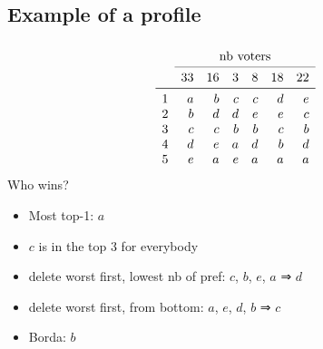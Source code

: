 \documentclass[french,english]{beamer}
\begin{document}
\subsection{Example of a profile}
\begin{frame}[fragile]
	\frametitle{\subsecname}
	\begin{equation}
		\begin{array}{lrrrrrr}
			&\multicolumn{6}{c}{\text{nb voters}}\\
		\cmidrule{2-7}
				&33	&16	&3	&8	&18	&22	\\
		\midrule
			1	&a	&b	&c	&c	&d	&e	\\
			2	&b	&d	&d	&e	&e	&c	\\
			3	&c	&c	&b	&b	&c	&b	\\
			4	&d	&e	&a	&d	&b	&d	\\
			5	&e	&a	&e	&a	&a	&a	\\
		\end{array}
	\end{equation}
	Who wins?\pause
	\begin{itemize}
		\item Most top-1: $a$
		\item $c$ is in the top 3 for everybody
		\item delete worst first, lowest nb of pref: $c$, $b$, $e$, $a$ ⇒ $d$
		\item delete worst first, from bottom: $a$, $e$, $d$, $b$ ⇒ $c$
		\item Borda: $b$
	\end{itemize}
\end{frame}
\end{document}
